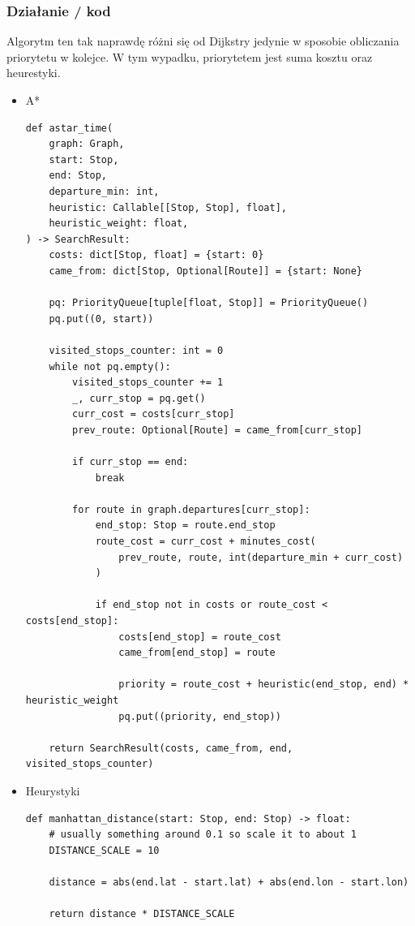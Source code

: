 \documentclass[a4paper, 12pt]{article}
\begin{document}
  \subsubsection{Działanie / kod}
  Algorytm ten tak naprawdę różni się od Dijkstry jedynie w sposobie obliczania priorytetu w kolejce.
  W tym wypadku, priorytetem jest suma kosztu oraz heurestyki.
  \begin{itemize}
    \item A*
\begin{lstlisting}
def astar_time(
    graph: Graph,
    start: Stop,
    end: Stop,
    departure_min: int,
    heuristic: Callable[[Stop, Stop], float],
    heuristic_weight: float,
) -> SearchResult:
    costs: dict[Stop, float] = {start: 0}
    came_from: dict[Stop, Optional[Route]] = {start: None}

    pq: PriorityQueue[tuple[float, Stop]] = PriorityQueue()
    pq.put((0, start))

    visited_stops_counter: int = 0
    while not pq.empty():
        visited_stops_counter += 1
        _, curr_stop = pq.get()
        curr_cost = costs[curr_stop]
        prev_route: Optional[Route] = came_from[curr_stop]

        if curr_stop == end:
            break

        for route in graph.departures[curr_stop]:
            end_stop: Stop = route.end_stop
            route_cost = curr_cost + minutes_cost(
                prev_route, route, int(departure_min + curr_cost)
            )

            if end_stop not in costs or route_cost < costs[end_stop]:
                costs[end_stop] = route_cost
                came_from[end_stop] = route

                priority = route_cost + heuristic(end_stop, end) * heuristic_weight
                pq.put((priority, end_stop))

    return SearchResult(costs, came_from, end, visited_stops_counter)
\end{lstlisting}


\item Heurystyki
\begin{lstlisting}
def manhattan_distance(start: Stop, end: Stop) -> float:
    # usually something around 0.1 so scale it to about 1
    DISTANCE_SCALE = 10

    distance = abs(end.lat - start.lat) + abs(end.lon - start.lon)

    return distance * DISTANCE_SCALE



\end{lstlisting}
\end{itemize}
\end{document}
